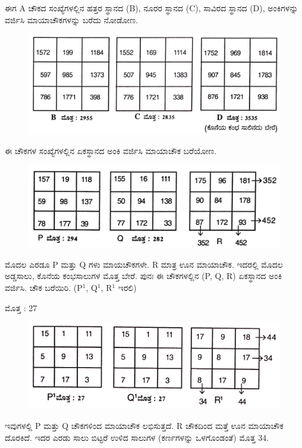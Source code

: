 ಈಗ A ಚೌಕದ ಸಂಖ್ಯೆಗಳಲ್ಲಿನ ಹತ್ತರ ಸ್ಥಾನದ (B), ನೂರರ ಸ್ಥಾನದ (C), ಸಾವಿರದ ಸ್ಥಾನದ (D), ಅಂಕಿಗಳನ್ನು ವರ್ಜಿಸಿ ಮಾಯಾಚೌಕಗಳನ್ನು ಬರೆದು ನೋಡೋಣ.
\begin{figure}[H]
\includegraphics{src/figures/chap7/fig7-10.jpg}
\end{figure}

ಈ ಚೌಕಗಳ ಸಂಖ್ಯೆಗಳಲ್ಲಿನ ಏಕಸ್ಥಾನದ ಅಂಕಿ ವರ್ಜಿಸಿ ಮಾಯಾಚೌಕ ಬರೆಯೋಣ.
\begin{figure}[H]
\includegraphics{src/figures/chap7/fig7-11.jpg}
\end{figure}

ಮೊದಲ ಎರಡೂ P ಮತ್ತು Q ಗಳು ಮಾಯಚೌಕಗಳೇ. R ಮಾತ್ರ ಊನ ಮಾಯಾಚೌಕ. ಇದರಲ್ಲಿ ಮೊದಲ ಅಡ್ಡಸಾಲು, ಕೊನೆಯ ಕಂಭಸಾಲುಗಳ ಮೊತ್ತ ಬೇರೆ. ಪುನಃ ಈ ಚೌಕಗಳಲ್ಲಿನ (P, Q, R) ಏಕಸ್ಥಾನದ ಅಂಕಿ ವರ್ಜಿಸಿ. ಚೌಕ ಬರೆಯಿರಿ. (P$^1$, Q$^1$, R$^1$ ಇರಲಿ)

ಮೊತ್ತ : 27
\begin{figure}[H]
\includegraphics{src/figures/chap7/fig7-12.jpg}
\end{figure}

ಇವುಗಳಲ್ಲಿ P ಮತ್ತು Q ಚೌಕಗಳಿಂದ ಮಾಯಾಚೌಕ ಲಭಿಸುತ್ತದೆ. R ಚೌಕದಿಂದ ಮತ್ತೆ ಊನ ಮಾಯಾಚೌಕ ದೊರಕಿದೆ. ಇದರ ಎರಡು ಸಾಲು ಬಿಟ್ಟರೆ ಉಳಿದ ಸಾಲುಗಳ (ಕರ್ಣಗಳನ್ನು ಒಳಗೊಂಡಂತೆ) ಮೊತ್ತ 34.

